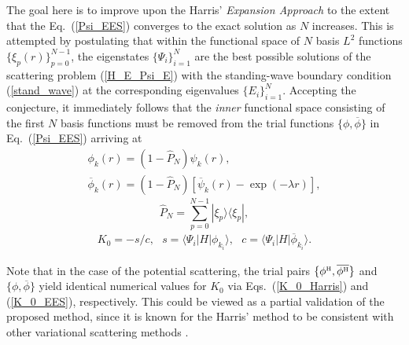 \documentclass[aip
, pra
, showpacs
, aps
, twocolumn
, groupedaddress
, floatfix
]{revtex4}
\newcommand{\beq}{\begin{equation}}
\newcommand{\eeq}{\end{equation}}
\newcommand{\barr}{\begin{array}}
\newcommand{\earr}{\end{array}}
\newcommand{\phiH}{\phi^{\mbox{\tiny{H}}}}
\begin{document}
The goal here is to improve upon the Harris' {\em Expansion Approach} \cite{Harris67} to the extent that the Eq.~(\ref{Psi_EES})
converges to the exact solution as $N$ increases.
This is attempted by postulating that
within the functional space of $N$ basis $L^2$ functions  $\{\xi_p(r)\}_{p=0}^{N-1}$,
the eigenstates $\{\Psi_i\}_{i=1}^{N}$ are the best possible solutions of the scattering problem (\ref{H_E_Psi_E})
with the standing-wave boundary condition (\ref{stand_wave}) at the corresponding eigenvalues $\{E_i\}_{i=1}^{N}$.
Accepting the conjecture, it immediately follows that the {\em inner} functional space consisting of the first $N$ basis functions
must be removed from the trial functions $\{\phi,\overline{\phi}\}$ in Eq.~(\ref{Psi_EES}) arriving at
\beq \barr{l}
\phi_k(r) = (1-\hat{P}_N) \psi_k(r),\\
\overline{\phi}_k(r) = (1-\hat{P}_N) [\overline{\psi}_k(r) - \exp{(-\lambda r)}],
\earr \label{def_phi} \eeq
\beq
\hat{P}_N = \sum_{p=0}^{N-1} | \xi_p \rangle \langle \xi_p |,
\label{P_N} \eeq
\beq \barr{l}
K_{0} = - s / c, \ \ \
s = \langle\Psi_i|H|  \phi_{k_i} \rangle, \ \ \
c =  \langle\Psi_i|H|  \overline{\phi}_{k_i} \rangle.
\earr \label{K_0_EES} \eeq


Note that in the case of the potential scattering, the trial pairs
$\{\phiH,\overline{\phiH}\}$ and $\{\phi,\overline{\phi}\}$ yield identical numerical values for $K_0$
via Eqs.~(\ref{K_0_Harris}) and (\ref{K_0_EES}), respectively.
This could be viewed as a partial validation of the proposed method,
since it is known for the Harris' method to be consistent with other variational scattering methods \cite{Nesbet68}.
\end{document}
